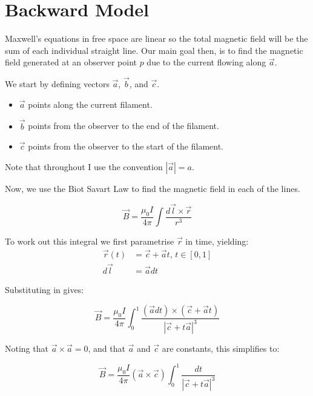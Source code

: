 \documentclass[12pt,a4paper]{report}
\begin{document}
\section{Backward Model}
Maxwell's equations in free space are linear so the total magnetic field will be the sum of each individual straight line. Our main goal then, is to find the magnetic field generated at an observer point $p$ due to the current flowing along $\vec{a}$.  

We start by defining vectors $\vec{a}$, $\vec{b}$, and $\vec{c}$. 
\begin{itemize}
  \item $\vec{a}$ points along the current filament. \\
  \item $\vec{b}$ points from the observer to the end of the filament. \\
  \item $\vec{c}$ points from the observer to the start of the filament.
\end{itemize}

Note that throughout I use the convention $\left \vert \vec{a} \right \vert = a$.

Now, we use the Biot Savart Law to find the magnetic field in each of the lines. 

\begin{equation}
  \vec{B} = \frac{\mu_0 I}{4\pi} \int \frac{d\vec{l}\times \vec{r}}{r^3}  
  \label{eq:}
\end{equation}

To work out this integral we first parametrise $\vec{r}$ in time, yielding:
\begin{align*}
  \vec{r}(t) &= \vec{c} + \vec{a}t \text{, } t \in [0,1] \\
  d\vec{l} &= \vec{a}dt
\end{align*}

Substituting in gives:

\begin{equation}
  \vec{B} = \frac{\mu_0 I}{4\pi} \int_{0}^{1} \frac{(\vec{a}dt)\times (\vec{c} + \vec{a}t)}{\left \vert \vec{c} +  t\vec{a}\right\vert^3}
\end{equation}

Noting that $\vec{a} \times \vec{a} = 0$, and that $\vec{a}$ and $\vec{c}$ are constants, this simplifies to:

\begin{equation} 
  \vec{B} = \frac{\mu_0 I}{4\pi}(\vec{a} \times \vec{c}) \int_{0}^{1}  \frac{dt}{\left \vert \vec{c} +  t\vec{a}\right\vert^3}
\end{equation}
\end{document}
